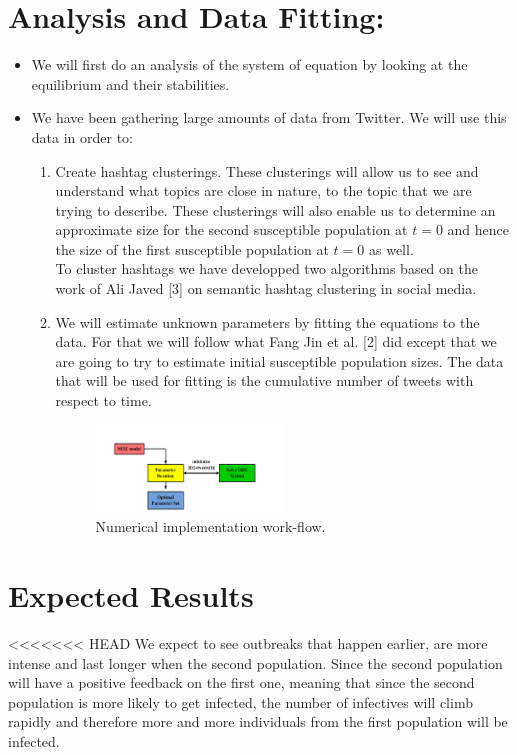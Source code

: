 \documentclass{article}
\begin{document}
\section{Analysis and Data Fitting:}
\begin{itemize}
\item We will first do an analysis of the system of equation by looking at the equilibrium and their stabilities. 
\item We have been gathering large amounts of data from Twitter. We will use this data in order to:
\begin{enumerate}
\item Create hashtag clusterings. These clusterings will allow us to see and understand what topics are close in nature, to the topic that we are trying to describe. These clusterings will also enable us to determine an approximate size for the second susceptible population at $t=0$ and hence the size of the first susceptible population at $t=0$ as well.
\\To cluster hashtags we have developped two algorithms based on the work of Ali Javed [3] on semantic hashtag clustering in social media. 
\item We will estimate unknown parameters by fitting the equations to the data.  For that we will follow what Fang Jin et al. [2] did except that we are going to try to estimate initial susceptible population sizes. The data that will be used for fitting is the cumulative number of tweets with respect to time. \\
\begin{figure}[h]
\centering
\includegraphics[width=0.5\textwidth]{workflow.png}
\caption{Numerical implementation work-flow.}
\end{figure}

\end{enumerate}

\end{itemize}
\section{Expected Results}
<<<<<<< HEAD
We expect to see outbreaks that happen earlier, are more intense and last longer when the second population. Since the second population will have a positive feedback on the first one, meaning that since the second population is more likely to get infected, the number of infectives will climb rapidly and therefore more and more individuals from the first population will be infected.
\end{document}
